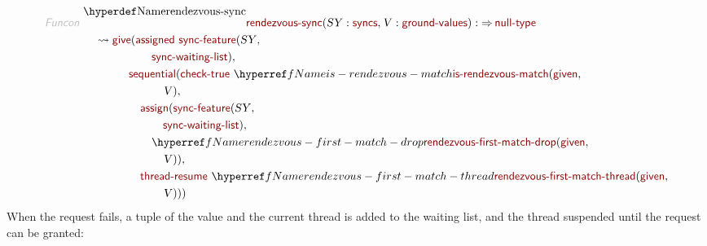 \begin{align*}
  \KEY{Funcon} ~ 
  & \NAMEDECL{rendezvous-sync}(\VAR{SY} : \NAME{syncs}, \VAR{V} : \NAME{ground-values}) :  \TO \NAME{null-type} \\
  & \quad \leadsto \NAME{give}
                     ( \NAME{assigned} ~
                         \NAME{sync-feature}
                           ( \VAR{SY}, \\&\quad \quad \quad \quad \quad \quad 
                             \NAME{sync-waiting-list} ), \\&\quad \quad \quad \quad 
                       \NAME{sequential}
                         ( \NAME{check-true} ~
                             \NAMEREF{is-rendezvous-match}
                               ( \NAME{given}, \\&\quad \quad \quad \quad \quad \quad \quad 
                                 \VAR{V} ), \\&\quad \quad \quad \quad \quad 
                           \NAME{assign}
                             ( \NAME{sync-feature}
                                 ( \VAR{SY}, \\&\quad \quad \quad \quad \quad \quad \quad 
                                   \NAME{sync-waiting-list} ), \\&\quad \quad \quad \quad \quad \quad 
                               \NAMEREF{rendezvous-first-match-drop}
                                 ( \NAME{given}, \\&\quad \quad \quad \quad \quad \quad \quad 
                                   \VAR{V} ) ), \\&\quad \quad \quad \quad \quad 
                           \NAME{thread-resume} ~
                             \NAMEREF{rendezvous-first-match-thread}
                               ( \NAME{given}, \\&\quad \quad \quad \quad \quad \quad \quad 
                                 \VAR{V} ) ) )
\end{align*}
When the request fails, a tuple of the value and the current thread is added
to the waiting list, and the thread suspended until the request can be granted:

